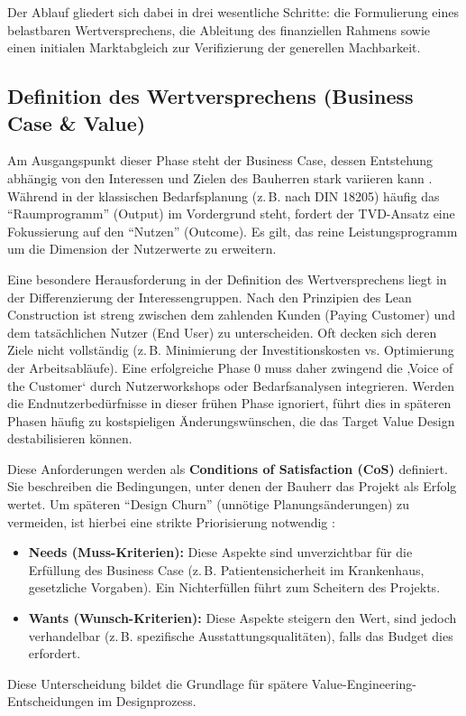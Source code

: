 Der Ablauf gliedert sich dabei in drei wesentliche Schritte: die Formulierung eines belastbaren Wertversprechens, die Ableitung des finanziellen Rahmens sowie einen initialen Marktabgleich zur Verifizierung der generellen Machbarkeit. \autocite[Vgl.][S.~23--25]{hill_target_2017}

\subsection{Definition des Wertversprechens (Business Case \& Value)}
\label{sec:4.2.1}
Am Ausgangspunkt dieser Phase steht der Business Case, dessen Entstehung abhängig von den Interessen und Zielen des Bauherren stark variieren kann \autocite[Vgl.][S.~18 f]{hill_target_2017}. Während in der klassischen Bedarfsplanung (z.\,B. nach DIN 18205) häufig das \enquote{Raumprogramm} (Output) im Vordergrund steht, fordert der \acs{TVD}-Ansatz eine Fokussierung auf den \enquote{Nutzen} (Outcome). Es gilt, das reine Leistungsprogramm um die Dimension der Nutzerwerte zu erweitern.

Eine besondere Herausforderung in der Definition des Wertversprechens liegt in der Differenzierung der Interessengruppen. Nach den Prinzipien des Lean Construction ist streng zwischen dem zahlenden Kunden (Paying Customer) und dem tatsächlichen Nutzer (End User) zu unterscheiden. Oft decken sich deren Ziele nicht vollständig (z.\,B. Minimierung der Investitionskosten vs. Optimierung der Arbeitsabläufe). Eine erfolgreiche Phase 0 muss daher zwingend die ‚Voice of the Customer‘ durch Nutzerworkshops oder Bedarfsanalysen integrieren. Werden die Endnutzerbedürfnisse in dieser frühen Phase ignoriert, führt dies in späteren Phasen häufig zu kostspieligen Änderungswünschen, die das Target Value Design destabilisieren können.\autocite[Vgl.][S.~4 f]{ballard_target_2025}

Diese Anforderungen werden als \textbf{Conditions of Satisfaction (\acs{CoS})} definiert. Sie beschreiben die Bedingungen, unter denen der Bauherr das Projekt als Erfolg wertet. Um späteren \enquote{Design Churn} (unnötige Planungsänderungen) zu vermeiden, ist hierbei eine strikte Priorisierung notwendig \autocite[Vgl.][S.~393]{zimina_target_2012}:
\begin{itemize}
    \item \textbf{Needs (Muss-Kriterien):} Diese Aspekte sind unverzichtbar für die Erfüllung des Business Case (z.\,B. Patientensicherheit im Krankenhaus, gesetzliche Vorgaben). Ein Nichterfüllen führt zum Scheitern des Projekts.
    \item \textbf{Wants (Wunsch-Kriterien):} Diese Aspekte steigern den Wert, sind jedoch verhandelbar (z.\,B. spezifische Ausstattungsqualitäten), falls das Budget dies erfordert.
\end{itemize}
Diese Unterscheidung bildet die Grundlage für spätere Value-Engineering-Entscheidungen im Designprozess.

